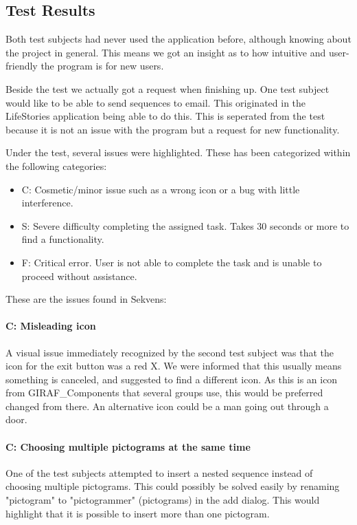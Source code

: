 \subsection{Test Results}\label{subsec:test_results}
Both test subjects had never used the application before, although knowing about the project in general. This means we got an insight as to how intuitive and user-friendly the program is for new users.

Beside the test we actually got a request when finishing up. One test subject would like to be able to send sequences to email. This originated in the LifeStories application being able to do this. This is seperated from the test because it is not an issue with the program but a request for new functionality.

Under the test, several issues were highlighted. These has been categorized within the following categories:

\begin{itemize}
\item C: Cosmetic/minor issue such as a wrong icon or a bug with little interference.
\item S: Severe difficulty completing the assigned task. Takes 30 seconds or more to find a functionality.
\item F: Critical error. User is not able to complete the task and is unable to proceed without assistance.
\end{itemize}

These are the issues found in Sekvens:

\paragraph{C: Misleading icon}
A visual issue immediately recognized by the second test subject was that the icon for the exit button was a red X. We were informed that this usually means something is canceled, and suggested to find a different icon. As this is an icon from GIRAF\_Components that several groups use, this would be preferred changed from there. An alternative icon could be a man going out through a door.

\paragraph{C: Choosing multiple pictograms at the same time}
One of the test subjects attempted to insert a nested sequence instead of choosing multiple pictograms. This could possibly be solved easily by renaming "pictogram" to "pictogrammer" (pictograms) in the add dialog. This would highlight that it is possible to insert more than one pictogram.

